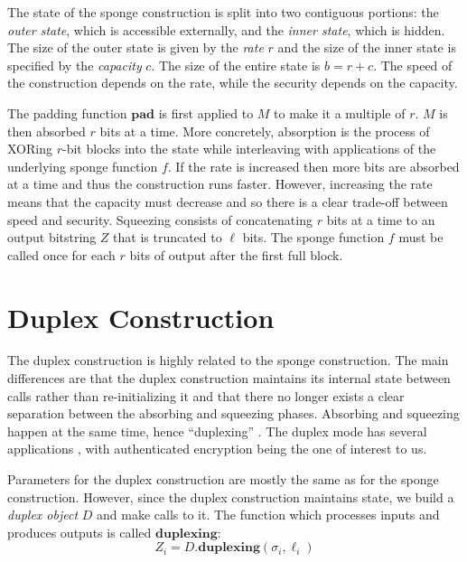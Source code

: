 The state of the sponge construction is split into two contiguous portions: the \emph{outer state}, which is accessible externally, and the \emph{inner state}, which is hidden.
The size of the outer state is given by the \emph{rate} $r$ and the size of the inner state is specified by the \emph{capacity} $c$.
The size of the entire state is $b = r + c$.
The speed of the construction depends on the rate, while the security depends on the capacity.

The padding function $\mathbf{pad}$ is first applied to $M$ to make it a multiple of $r$.
$M$ is then absorbed $r$ bits at a time.
More concretely, absorption is the process of XORing $r$-bit blocks into the state while interleaving with applications of the underlying sponge function $f$.
If the rate is increased then more bits are absorbed at a time and thus the construction runs faster.
However, increasing the rate means that the capacity must decrease and so there is a clear trade-off between speed and security.
Squeezing consists of concatenating $r$ bits at a time to an output bitstring $Z$ that is truncated to $\ell$ bits.
The sponge function $f$ must be called once for each $r$ bits of output after the first full block.


\section{Duplex Construction}
The duplex construction is highly related to the sponge construction.
The main differences are that the duplex construction maintains its internal state between calls rather than re-initializing it and that there no longer exists a clear separation between the absorbing and squeezing phases.
Absorbing and squeezing happen at the same time, hence ``duplexing'' \cite{Bertoni2012_Duplexing}.
The duplex mode has several applications \cite{Bertoni2010_DuplexingSlides}, with authenticated encryption being the one of interest to us.

Parameters for the duplex construction are mostly the same as for the sponge construction.
However, since the duplex construction maintains state, we build a \emph{duplex object} $D$ and make calls to it.
The function which processes inputs and produces outputs is called $\mathbf{duplexing}$:
\begin{equation*}
Z_i = D.\mathbf{duplexing}(\sigma_i,\ell_i)
\end{equation*}

